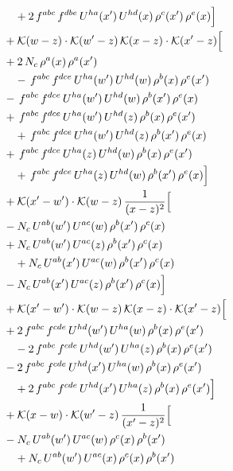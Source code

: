 \begin{align}
&\quad +2\,f^{abc}\,f^{dbe}\,U^{ha}(x')\,U^{hd}(x)\,\rho^{c}(x')\,\rho^{e}(x)\Big]\notag\\
& +\mathcal{K}(w-z)\cdot\mathcal{K}(w'-z)\,\mathcal{K}(x-z)\cdot\mathcal{K}(x'-z)\Big[\notag\\
& +2\,N_{c}\,\rho^{a}(x)\,\rho^{a}(x')\notag\\
&\quad -\,f^{abc}\,f^{dce}\,U^{ha}(w')\,U^{hd}(w)\,\rho^{b}(x)\,\rho^{e}(x')\notag\\
& -\,f^{abc}\,f^{dce}\,U^{ha}(w')\,U^{hd}(w)\,\rho^{b}(x')\,\rho^{e}(x) \notag\\
& +\,f^{abc}\,f^{dce}\,U^{ha}(w')\,U^{hd}(z)\,\rho^{b}(x)\,\rho^{e}(x')\notag\\
&\quad +\,f^{abc}\,f^{dce}\,U^{ha}(w')\,U^{hd}(z)\,\rho^{b}(x')\,\rho^{e}(x)\notag\\
& +\,f^{abc}\,f^{dce}\,U^{ha}(z)\,U^{hd}(w)\,\rho^{b}(x)\,\rho^{e}(x') \notag\\
&\quad +\,f^{abc}\,f^{dce}\,U^{ha}(z)\,U^{hd}(w)\,\rho^{b}(x')\,\rho^{e}(x)\Big]\notag\\
& +\mathcal{K}(x'-w')\cdot\mathcal{K}(w-z)\,\frac{1}{(x-z)^{2}}\Big[\notag\\
& -N_{c}\,U^{ab}(w')\,U^{ac}(w)\,\rho^{b}(x')\,\rho^{c}(x) \notag\\
& +N_{c}\,U^{ab}(w')\,U^{ac}(z)\,\rho^{b}(x')\,\rho^{c}(x)\notag\\
&\quad +N_{c}\,U^{ab}(x')\,U^{ac}(w)\,\rho^{b}(x')\,\rho^{c}(x)\notag\\
& -N_{c}\,U^{ab}(x')\,U^{ac}(z)\,\rho^{b}(x')\,\rho^{c}(x)\Big]\notag\\
& +\mathcal{K}(x'-w')\cdot\mathcal{K}(w-z)\,\mathcal{K}(x-z)\cdot\mathcal{K}(x'-z)\Big[\notag\\
& +2\,f^{abc}\,f^{cde}\,U^{hd}(w')\,U^{ha}(w)\,\rho^{b}(x)\,\rho^{e}(x')\notag\\
&\quad -2\,f^{abc}\,f^{cde}\,U^{hd}(w')\,U^{ha}(z)\,\rho^{b}(x)\,\rho^{e}(x')\notag\\
& -2\,f^{abc}\,f^{cde}\,U^{hd}(x')\,U^{ha}(w)\,\rho^{b}(x)\,\rho^{e}(x') \notag\\
&\quad +2\,f^{abc}\,f^{cde}\,U^{hd}(x')\,U^{ha}(z)\,\rho^{b}(x)\,\rho^{e}(x')\Big]\notag\\
& +\mathcal{K}(x-w)\cdot\mathcal{K}(w'-z)\,\frac{1}{(x'-z)^{2}}\Big[\notag\\
& -N_{c}\,U^{ab}(w')\,U^{ac}(w)\,\rho^{c}(x)\,\rho^{b}(x')\notag\\
&\quad +N_{c}\,U^{ab}(w')\,U^{ac}(x)\,\rho^{c}(x)\,\rho^{b}(x')\notag\\

\end{align}
